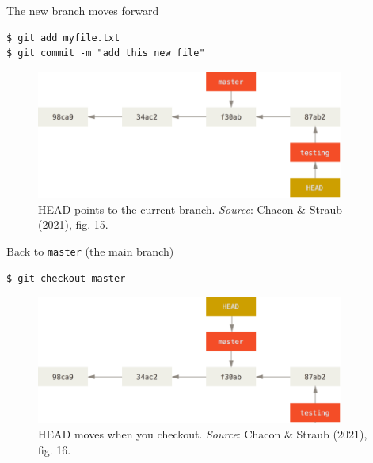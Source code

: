 \documentclass[handout]{beamer}
\begin{document}
\begin{frame}[fragile]{The new branch moves forward}

\begin{lstlisting}
$ git add myfile.txt
$ git commit -m "add this new file"
\end{lstlisting}

\begin{figure}
	\includegraphics[width=0.9\textwidth]{figures/fig15_testing_forward.png}
	\caption{HEAD points to the current branch. \textit{Source}: Chacon \& Straub (2021), fig. 15.}
\end{figure}
\end{frame}


\begin{frame}[fragile]{Back to \texttt{master} (the main branch)}

\begin{lstlisting}
$ git checkout master
\end{lstlisting}

\begin{figure}
	\includegraphics[width=0.9\textwidth]{figures/fig16_back_to_master.png}
	\caption{HEAD moves when you checkout. \textit{Source}: Chacon \& Straub (2021), fig. 16.}
\end{figure}
\end{frame}
\end{document}
